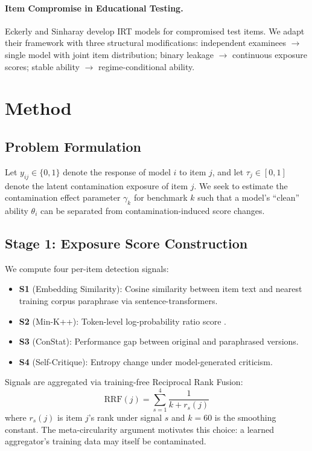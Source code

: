 \documentclass[11pt,a4paper]{article}
\newcommand{\gam}{\gamma}
\newcommand{\thet}{\theta}
\begin{document}
\paragraph{Item Compromise in Educational Testing.}
Eckerly \cite{eckerly2017detecting} and Sinharay \cite{sinharay2017assessing} develop IRT models for compromised test items. We adapt their framework with three structural modifications: independent examinees $\to$ single model with joint item distribution; binary leakage $\to$ continuous exposure scores; stable ability $\to$ regime-conditional ability.

\section{Method}

\subsection{Problem Formulation}

Let $y_{ij} \in \{0,1\}$ denote the response of model $i$ to item $j$, and let $\tau_j \in [0,1]$ denote the latent contamination exposure of item $j$. We seek to estimate the contamination effect parameter $\gam_k$ for benchmark $k$ such that a model's ``clean'' ability $\thet_i$ can be separated from contamination-induced score changes.

\subsection{Stage 1: Exposure Score Construction}

We compute four per-item detection signals:
\begin{itemize}[leftmargin=*,nosep]
\item \textbf{S1} (Embedding Similarity): Cosine similarity between item text and nearest training corpus paraphrase via sentence-transformers.
\item \textbf{S2} (Min-K++): Token-level log-probability ratio score \cite{shi2024detecting}.
\item \textbf{S3} (ConStat): Performance gap between original and paraphrased versions.
\item \textbf{S4} (Self-Critique): Entropy change under model-generated criticism.
\end{itemize}

Signals are aggregated via training-free Reciprocal Rank Fusion:
\begin{equation}
\text{RRF}(j) = \sum_{s=1}^{4} \frac{1}{k + r_s(j)}
\end{equation}
where $r_s(j)$ is item $j$'s rank under signal $s$ and $k{=}60$ is the smoothing constant. The meta-circularity argument motivates this choice: a learned aggregator's training data may itself be contaminated.
\end{document}
